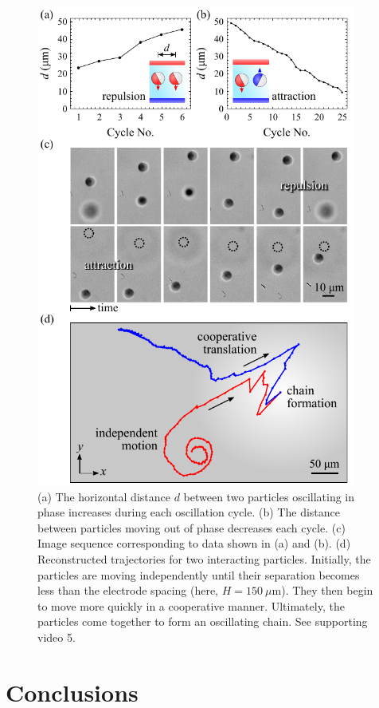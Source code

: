 \begin{figure}[p]
\centering
\includegraphics[width=10.5cm]{figures/2_5.pdf}
\caption{(a) The horizontal distance $d$ between two particles oscillating in phase increases during each oscillation cycle. (b) The distance between particles moving out of phase decreases each cycle. (c) Image sequence corresponding to data shown in (a) and (b). (d) Reconstructed trajectories for two interacting particles.  Initially, the particles are moving independently until their separation becomes less than the electrode spacing (here, $H=150~\mu\text{m}$). They then begin to move more quickly in a cooperative manner.  Ultimately, the particles come together to form an oscillating chain. See supporting video 5.}
\label{fig:2.5}
\end{figure}



\section{Conclusions}

